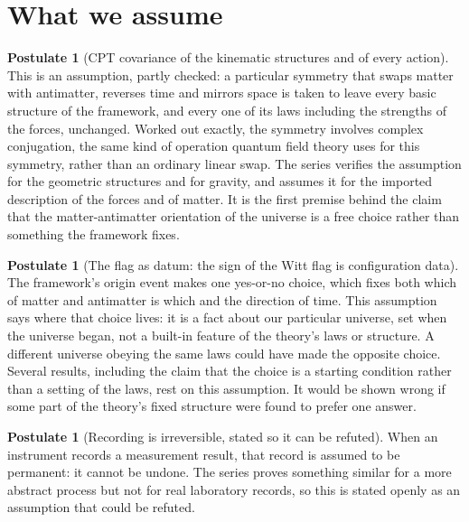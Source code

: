 \documentclass[11pt]{article}
\theoremstyle{definition}
\newtheorem{postulate}[theorem]{Postulate}
\theoremstyle{plain}
\begin{document}
\section{What we assume}

\begin{postulate}[CPT covariance of the kinematic structures and of every action]\label{c:dark-matter.premise-cpt-covariance}
This is an assumption, partly checked: a particular symmetry that swaps matter with antimatter, reverses time and mirrors space is taken to leave every basic structure of the framework, and every one of its laws including the strengths of the forces, unchanged. Worked out exactly, the symmetry involves complex conjugation, the same kind of operation quantum field theory uses for this symmetry, rather than an ordinary linear swap. The series verifies the assumption for the geometric structures and for gravity, and assumes it for the imported description of the forces and of matter. It is the first premise behind the claim that the matter-antimatter orientation of the universe is a free choice rather than something the framework fixes.
\end{postulate}

\begin{postulate}[The flag as datum: the sign of the Witt flag is configuration data]\label{c:dark-matter.premise-flag-as-datum}
The framework's origin event makes one yes-or-no choice, which fixes both which of matter and antimatter is which and the direction of time. This assumption says where that choice lives: it is a fact about our particular universe, set when the universe began, not a built-in feature of the theory's laws or structure. A different universe obeying the same laws could have made the opposite choice. Several results, including the claim that the choice is a starting condition rather than a setting of the laws, rest on this assumption. It would be shown wrong if some part of the theory's fixed structure were found to prefer one answer.
\end{postulate}

\begin{postulate}[Recording is irreversible, stated so it can be refuted]\label{c:one-relation.recording-irreversible-stated-so-it-can}
When an instrument records a measurement result, that record is assumed to be permanent: it cannot be undone. The series proves something similar for a more abstract process but not for real laboratory records, so this is stated openly as an assumption that could be refuted.
\end{postulate}
\end{document}
